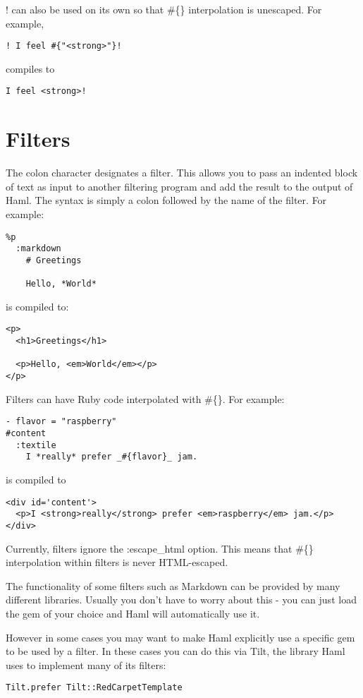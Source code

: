 \documentclass[9pt]{article}
\begin{document}
 ! can also be used on its own so that \#\{\} interpolation is unescaped. For example,
\begin{verbatim}
! I feel #{"<strong>"}!
\end{verbatim}


 compiles to
\begin{verbatim}
I feel <strong>!
\end{verbatim}
\section{Filters}


 The colon character designates a filter. This allows you to pass an indented block of text as input to another filtering program and add the result to the output of Haml. The syntax is simply a colon followed by the name of the filter. For example:
\begin{verbatim}
%p
  :markdown
    # Greetings

    Hello, *World*
\end{verbatim}


 is compiled to:
\begin{verbatim}
<p>
  <h1>Greetings</h1>

  <p>Hello, <em>World</em></p>
</p>
\end{verbatim}


 Filters can have Ruby code interpolated with \#\{\}. For example:
\begin{verbatim}
- flavor = "raspberry"
#content
  :textile
    I *really* prefer _#{flavor}_ jam.
\end{verbatim}


 is compiled to
\begin{verbatim}
<div id='content'>
  <p>I <strong>really</strong> prefer <em>raspberry</em> jam.</p>
</div>
\end{verbatim}


 Currently, filters ignore the :escape\_html option. This means that \#\{\} interpolation within filters is never HTML-escaped.


 The functionality of some filters such as Markdown can be provided by many different libraries. Usually you don’t have to worry about this - you can just load the gem of your choice and Haml will automatically use it.


 However in some cases you may want to make Haml explicitly use a specific gem to be used by a filter. In these cases you can do this via Tilt, the library Haml uses to implement many of its filters:
\begin{verbatim}
Tilt.prefer Tilt::RedCarpetTemplate
\end{verbatim}
\end{document}

